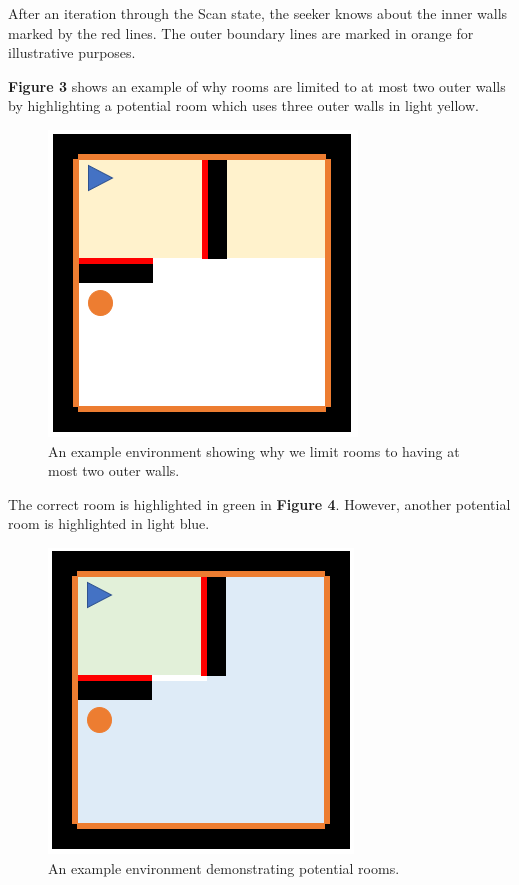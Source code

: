 \documentclass[12pt]{article}
\begin{document}
After an iteration through the Scan state, the seeker knows about the inner walls marked by the red lines. The outer boundary lines are marked in orange for illustrative purposes. 

\textbf{Figure 3} shows an example of why rooms are limited to at most two outer walls by highlighting a potential room which uses three outer walls in light yellow. 

\begin{figure}[htbp]
\centering
\includegraphics[width=0.5\linewidth]{wrongwalls.PNG} 
\caption{An example environment showing why we limit rooms to having at most two outer walls.}
\end{figure} 

The correct room is highlighted in green in \textbf{Figure 4}. However, another potential room is highlighted in light blue.

\begin{figure}[htbp]
\centering
\includegraphics[width=0.5\linewidth]{potentialrooms.PNG} 
\caption{An example environment demonstrating potential rooms.}
\end{figure} 
\end{document}
